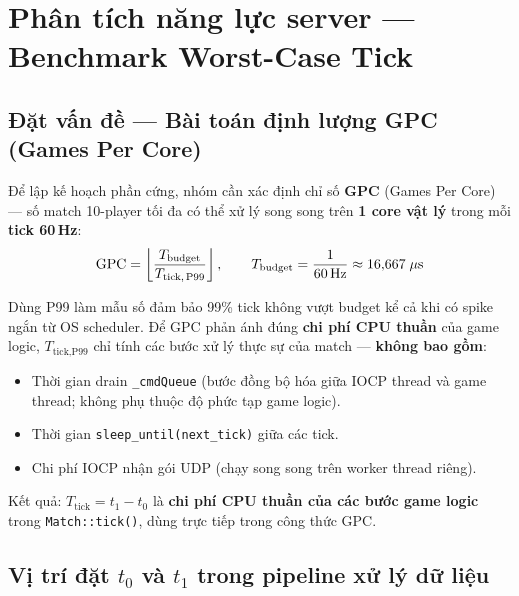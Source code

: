 \documentclass[12pt,a4paper]{report}
\begin{document}
\section{Phân tích năng lực server --- Benchmark Worst-Case Tick}

\subsection{Đặt vấn đề --- Bài toán định lượng GPC (Games Per Core)}

Để lập kế hoạch phần cứng, nhóm cần xác định chỉ số \textbf{GPC}
(Games Per Core) --- số match 10-player tối đa có thể xử lý song song
trên \textbf{1 core vật lý} trong mỗi \textbf{tick 60\,Hz}:
\[
  \text{GPC} = \left\lfloor \frac{T_{\text{budget}}}{T_{\text{tick,\,P99}}} \right\rfloor,
  \qquad T_{\text{budget}} = \frac{1}{60\,\text{Hz}} \approx 16{,}667\;\mu\text{s}
\]

Dùng P99 làm mẫu số đảm bảo 99\% tick không vượt budget kể cả khi có spike
ngắn từ OS scheduler. Để GPC phản ánh đúng \textbf{chi phí CPU thuần} của game logic,
$T_{\text{tick,P99}}$ chỉ tính các bước xử lý thực sự của match ---
\textbf{không bao gồm}:

\begin{itemize}
  \item Thời gian drain \texttt{\_cmdQueue} (bước đồng bộ hóa giữa IOCP thread
        và game thread; không phụ thuộc độ phức tạp game logic).
  \item Thời gian \texttt{sleep\_until(next\_tick)} giữa các tick.
  \item Chi phí IOCP nhận gói UDP (chạy song song trên worker thread riêng).
\end{itemize}

\noindent Kết quả: $T_{\text{tick}} = t_1 - t_0$ là \textbf{chi phí CPU thuần của
các bước game logic} trong \texttt{Match::tick()}, dùng trực tiếp trong công thức GPC.

\subsection{Vị trí đặt \texorpdfstring{$t_0$}{t0} và \texorpdfstring{$t_1$}{t1}
            trong pipeline xử lý dữ liệu}
\end{document}
